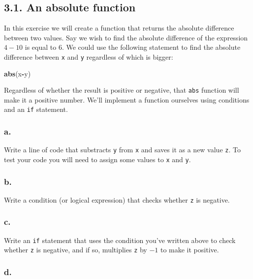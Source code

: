 \documentclass[]{article}
\newenvironment{Shaded}{\begin{snugshade}}{\end{snugshade}}
\newcommand{\KeywordTok}[1]{\textcolor[rgb]{0.13,0.29,0.53}{\textbf{#1}}}
\newcommand{\NormalTok}[1]{#1}
\newcommand{\OperatorTok}[1]{\textcolor[rgb]{0.81,0.36,0.00}{\textbf{#1}}}
\begin{document}
\hypertarget{an-absolute-function}{%
\subsection{3.1. An absolute function}\label{an-absolute-function}}

In this exercise we will create a function that returns the absolute
difference between two values. Say we wish to find the absolute
difference of the expression \(4 - 10\) is equal to \(6\). We could use
the following statement to find the absolute difference between
\texttt{x} and \texttt{y} regardless of which is bigger:

\begin{Shaded}
\begin{Highlighting}[]
\KeywordTok{abs}\NormalTok{(x}\OperatorTok{-}\NormalTok{y)}
\end{Highlighting}
\end{Shaded}

Regardless of whether the result is positive or negative, that
\texttt{abs} function will make it a positive number. We'll implement a
function ourselves using conditions and an \texttt{if} statement.

\hypertarget{a.-4}{%
\subsubsection{a.}\label{a.-4}}

Write a line of code that substracts \texttt{y} from \texttt{x} and
saves it as a new value \texttt{z}. To test your code you will need to
assign some values to \texttt{x} and \texttt{y}.

\hypertarget{b.-4}{%
\subsubsection{b.}\label{b.-4}}

Write a condition (or logical expression) that checks whether \texttt{z}
is negative.

\hypertarget{c.-4}{%
\subsubsection{c.}\label{c.-4}}

Write an \texttt{if} statement that uses the condition you've written
above to check whether \texttt{z} is negative, and if so, multiplies
\texttt{z} by \(-1\) to make it positive.

\hypertarget{d.-3}{%
\subsubsection{d.}\label{d.-3}}
\end{document}

